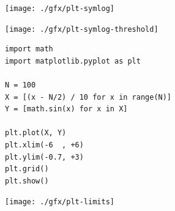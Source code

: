 
\begin{frame}[fragile]
%
\begin{tcbraster}[raster columns=2,
                  raster equal height,
                  nobeforeafter,
                  raster column skip=0.5cm]
\begin{tcolorbox}[title=symlog{,} default threshold]
	\texttt{[image: ./gfx/plt-symlog]}
\end{tcolorbox}
%
\begin{tcolorbox}[title=symlog{,} explicit threshold]
	\texttt{[image: ./gfx/plt-symlog-threshold]}
\end{tcolorbox}
\end{tcbraster}
%
\end{frame}


\begin{frame}[fragile]
%
\begin{codebox}[Example: Manually Scaled Axes, width=.53\linewidth, nobeforeafter, equal height group = grpXmpSimplePlotScale]
\begin{verbatim}
import math
import matplotlib.pyplot as plt

N = 100
X = [(x - N/2) / 10 for x in range(N)]
Y = [math.sin(x) for x in X]

plt.plot(X, Y)
plt.xlim(-6  , +6)
plt.ylim(-0.7, +3)
plt.grid()
plt.show()
\end{verbatim}
\end{codebox}
%
\begin{tcolorbox}[title=Output: Manually Scaled Axes, width=.45\linewidth, nobeforeafter, equal height group = grpXmpSimplePlotScale]
	\texttt{[image: ./gfx/plt-limits]}
\end{tcolorbox}
%
\end{frame}

